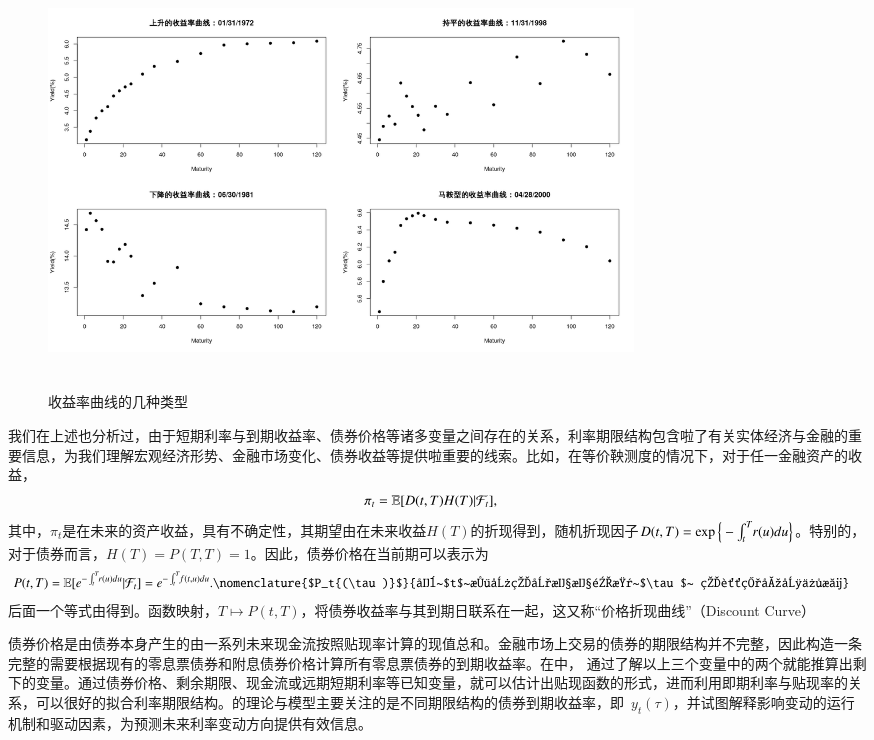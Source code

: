     \begin{figure}%
    \includegraphics[width=15.5cm,height=11cm]{figures/yieldcurve}
   \caption{收益率曲线的几种类型}
   \label{tale_fig04}
  \end{figure}
  
我们在上述也分析过，由于短期利率与到期收益率、债券价格等诸多变量之间存在的关系，利率期限结构包含啦了有关实体经济与金融的重要信息，为我们理解宏观经济形势、金融市场变化、债券收益等提供啦重要的线索。比如，在等价鞅测度的情况下，对于任一金融资产的收益，
\begin{align}
 \pi_t &= \mathbb{E}[D(t,T)H(T)|\mathcal{F}_t],
\end{align}
其中，$\pi_t$是在未来的资产收益，具有不确定性，其期望由在未来收益$H(T)$的折现得到，随机折现因子$D(t,T)=\exp\Big\{-\int_{t}^{T} \hspace{-.5ex} r(u)du\Big\}$。特别的，对于债券而言，$H(T) = P(T,T) = 1$。因此，债券价格在当前期可以表示为
\begin{align}
 P(t,T) &=  \E[e^{-\int_{t}^{T} \hspace{-.5ex} r(u)du} |\mathcal{F}_t] = e^{ -\int_{t}^{T}\hspace{-.5ex}  f(t,u) du  }. \label{bond-curve}
 \nomenclature{$P_t{(\tau)}$}{在~$t$~时刻的到期期限是~$\tau$~ 的贴现债券价格}
\end{align}
后面一个等式由得到。函数映射，$T\mapsto P(t, T)$，将债券收益率与其到期日联系在一起，这又称``价格折现曲线''（Discount Curve）

债券价格是由债券本身产生的由一系列未来现金流按照贴现率计算的现值总和。金融市场上交易的债券的期限结构并不完整，因此构造一条完整的\ts{}需要根据现有的零息票债券和附息债券价格计算所有零息票债券的到期收益率。在中，
通过了解以上三个变量中的两个就能推算出剩下的变量。通过债券价格、剩余期限、现金流或远期短期利率等已知变量，就可以估计出贴现函数的形式，进而利用即期利率与贴现率的关系，可以很好的拟合利率期限结构。\tsm 的理论与模型主要关注的是不同期限结构的债券到期收益率，即~$y_t{(\tau)}$，并试图解释影响\ts 变动的运行机制和驱动因素，为预测未来利率变动方向提供有效信息。

